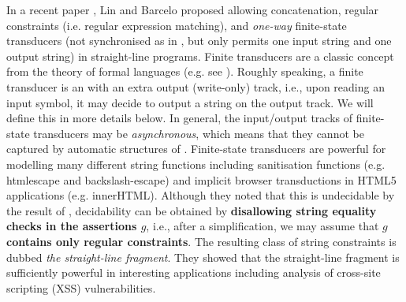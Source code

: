In a recent paper \cite{LB16}, Lin and Barcelo 
proposed allowing concatenation, regular constraints (i.e. regular expression 
matching), and \emph{one-way} finite-state transducers (not synchronised as in \cite{BTV09}, but only permits one input string and one output string) in 
straight-line programs. Finite transducers are a classic concept from
the theory of formal languages (e.g. see \cite{Berstel}).
Roughly speaking, a finite transducer is an \FA{} with an extra output (write-only) 
track, i.e., upon reading an input symbol, it may decide to output a string 
on the output track. We will define this in more details below.
In general, the input/output tracks of finite-state transducers may be 
\emph{asynchronous}, which means that they cannot be captured by automatic structures of \cite{BG04}. 
Finite-state transducers are powerful for modelling many
different string functions including sanitisation functions (e.g. htmlescape and
backslash-escape) and implicit browser transductions in HTML5 applications (e.g.
innerHTML). Although they noted that this is
undecidable by the result of \cite{BFL13}, decidability can be obtained 
by {\bf disallowing string equality checks in the assertions $g$}, i.e., after
a simplification, we may assume that {\bf $g$ contains only regular constraints}.
The 
resulting class of string constraints is dubbed \emph{the straight-line 
fragment}.
They showed that the straight-line fragment is sufficiently powerful in
interesting applications including analysis of cross-site scripting (XSS)
vulnerabilities. 

